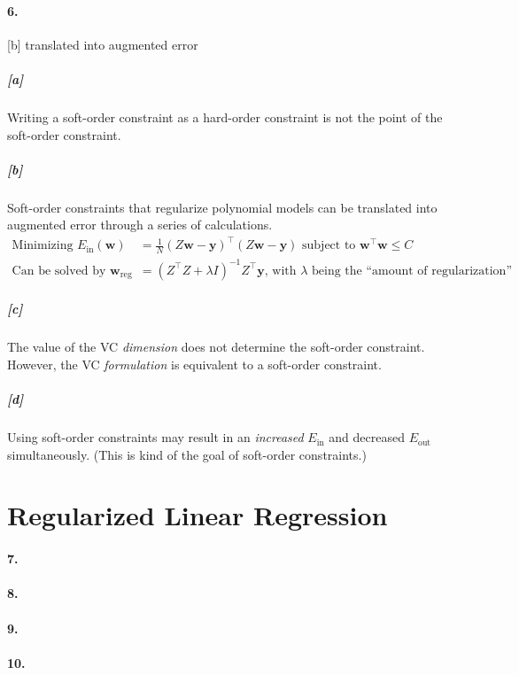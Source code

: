 \documentclass[titlepage]{article}
\newcommand*{\tran}{\intercal}
\newcommand*{\reg}{\text{reg}}
\begin{document}
\paragraph{6.} [b] translated into augmented error

	\subparagraph{[a]} Writing a soft-order constraint as a hard-order constraint is not the point of the soft-order constraint.

	\subparagraph{[b]} Soft-order constraints that regularize polynomial models can be translated into augmented error through a series of calculations. 
	\begin{align*}
	\text{Minimizing } E_{\text{in}}(\bm w) &= \frac{1}{N} (Z\bm w - \bm y)^\tran(Z\bm w - \bm y) \text{ subject to } \bm w^\tran \bm w \leq C \\
	\text{Can be solved by }\bm w_{\reg} &= (Z^\tran Z + \lambda I )^{-1}Z^\tran \bm y \text{, with $\lambda$ being the ``amount of regularization''}
	\end{align*}
	
	\subparagraph{[c]} The value of the VC \textit{dimension} does not determine the soft-order constraint. However, the VC \textit{formulation} is equivalent to a soft-order constraint. 
	
	\subparagraph{[d]} Using soft-order constraints may result in an \textit{increased} $E_{\text{in}}$ and decreased $E_{\text{out}}$ simultaneously. (This is kind of the goal of soft-order constraints.)

\section*{Regularized Linear Regression}
\paragraph{7.} 
\paragraph{8.} 
\paragraph{9.} 
\paragraph{10.} 

\end{document}
